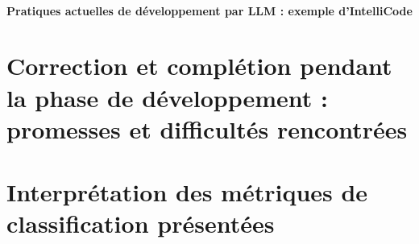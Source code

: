             \paragraph*{Pratiques actuelles de développement par LLM : exemple d'IntelliCode}
    \section{Correction et complétion pendant la phase de développement : promesses et difficultés rencontrées}
    \section{Interprétation des métriques de classification présentées}
